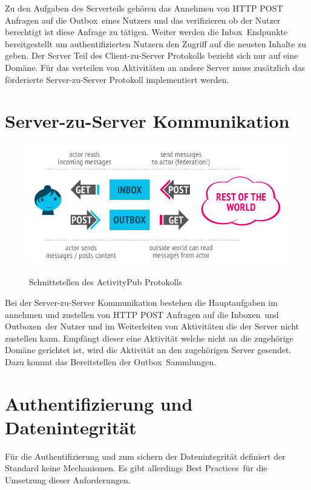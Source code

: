 	Zu den Aufgaben des Serverteils gehören das Annehmen von HTTP POST Anfragen auf die \glqq Outbox\grqq~eines Nutzers und das verifizieren ob der Nutzer berechtigt ist diese Anfrage zu tätigen. Weiter werden die \glqq Inbox\grqq~Endpunkte bereitgestellt um authentifizierten Nutzern den Zugriff auf die neusten Inhalte zu geben. Der Server Teil des Client-zu-Server Protokolls bezieht sich nur auf eine Domäne. Für das verteilen von Aktivitäten an andere Server muss zusätzlich das förderierte Server-zu-Server Protokoll implementiert werden.

\section{Server-zu-Server Kommunikation}
	\begin{figure}[h]
		\begin{minipage}{\textwidth}
			\centering
			\includegraphics[scale=0.55]{figures/client-server-federated.png}
			\label{Client zu Server und Server zu Server Interaktionen}
			\caption{Schnittstellen des ActivityPub Protokolls}
		\end{minipage}
	\end{figure}
	Bei der Server-zu-Server Kommunikation bestehen die Hauptaufgaben im annehmen und zustellen von HTTP POST Anfragen auf die \glqq Inboxen\grqq~und \glqq Outboxen\grqq~der Nutzer und im Weiterleiten von Aktivitäten die der Server nicht zustellen kann. Empfängt dieser eine Aktivität welche nicht an die zugehörige Domäne gerichtet ist, wird die Aktivität an den zugehörigen Server gesendet. Dazu kommt das Bereitstellen der \glqq Outbox\grqq~Sammlungen.
	
\section{Authentifizierung und Datenintegrität}
	Für die Authentifizierung und zum sichern der Datenintegrität definiert der Standard keine Mechanismen. Es gibt allerdings \glqq Best Practices\grqq~für die Umsetzung dieser Anforderungen.\\
	
